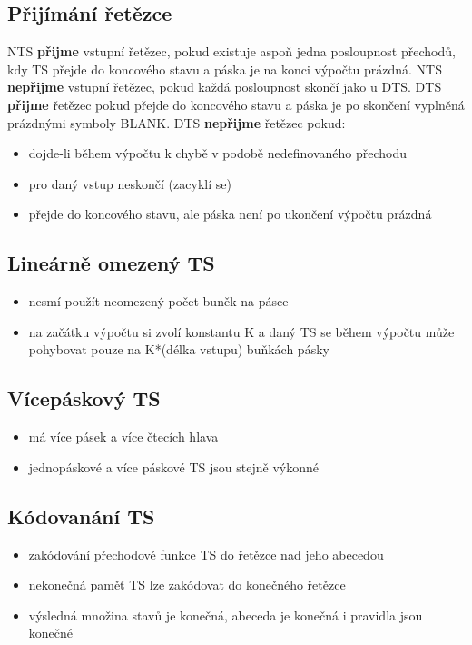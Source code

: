 \documentclass{szzclass}
\begin{document}
\subsection{Přijímání řetězce}
NTS \textbf{přijme} vstupní řetězec, pokud existuje aspoň jedna posloupnost přechodů, kdy TS přejde do koncového stavu a páska je na konci výpočtu prázdná.
\newline
NTS \textbf{nepřijme} vstupní řetězec, pokud každá posloupnost skončí jako u DTS.
\newline
\newline
DTS \textbf{přijme} řetězec pokud přejde do koncového stavu a páska je po skončení vyplněná prázdnými symboly BLANK.
\newline
DTS \textbf{nepřijme} řetězec pokud:
\begin{itemize}
\item dojde-li během výpočtu k chybě v podobě nedefinovaného přechodu
\item pro daný vstup neskončí (zacyklí se)
\item přejde do koncového stavu, ale páska není po ukončení výpočtu prázdná
\end{itemize}

\subsection{Lineárně omezený TS}
\begin{itemize}
\item nesmí použít neomezený počet buněk na pásce
\item na začátku výpočtu si zvolí konstantu K a daný TS se během výpočtu může pohybovat pouze na K*(délka vstupu) buňkách pásky
\end{itemize}

\subsection{Vícepáskový TS}
\begin{itemize}
\item má více pásek a více čtecích hlava
\item jednopáskové a více páskové TS jsou stejně výkonné
\end{itemize}
\subsection{Kódovanání TS}
\begin{itemize}
\item zakódování přechodové funkce TS do řetězce nad jeho abecedou
\item nekonečná paměť TS lze zakódovat do konečného řetězce
\item výsledná množina stavů je konečná, abeceda je konečná i pravidla jsou konečné
\end{itemize}
\end{document}
